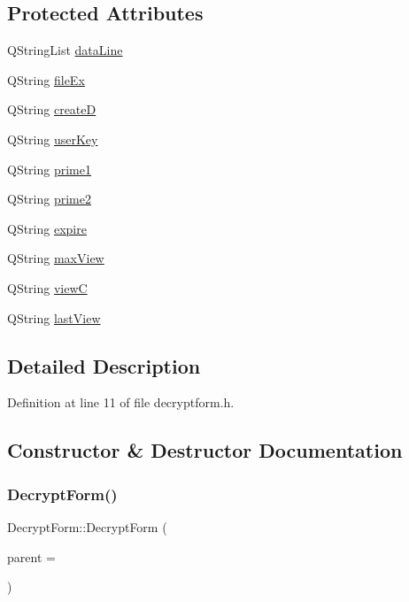 \subsection*{Protected Attributes}
\begin{DoxyCompactItemize}
\item 
Q\+String\+List \hyperlink{class_decrypt_form_a16c208fef98e40521b962932602ce0ff}{data\+Line}
\item 
Q\+String \hyperlink{class_decrypt_form_a948100789ce9a1613fc4e028609d7f7d}{file\+Ex}
\item 
Q\+String \hyperlink{class_decrypt_form_af0a16237e0a531f3167acd67eae7e69b}{createD}
\item 
Q\+String \hyperlink{class_decrypt_form_a9b9b4da9c4713812a4ef07e8e60dd25a}{user\+Key}
\item 
Q\+String \hyperlink{class_decrypt_form_a2a575d06f53701521157379069b573f0}{prime1}
\item 
Q\+String \hyperlink{class_decrypt_form_ac9b5eaa528b2826f3926e410e6ffa967}{prime2}
\item 
Q\+String \hyperlink{class_decrypt_form_ac0a3281de07c0e2b461652ce12b1ada2}{expire}
\item 
Q\+String \hyperlink{class_decrypt_form_ada58fe6ec6a6c8204e30dfdbb9e55bbe}{max\+View}
\item 
Q\+String \hyperlink{class_decrypt_form_a6363fdac4c8f9ebbdc902f1b8e3686a3}{viewC}
\item 
Q\+String \hyperlink{class_decrypt_form_a64370269794155fc85fafa42a1d31913}{last\+View}
\end{DoxyCompactItemize}


\subsection{Detailed Description}


Definition at line 11 of file decryptform.\+h.



\subsection{Constructor \& Destructor Documentation}
\hypertarget{class_decrypt_form_adedf517dfb4bb9411c4caf92943e7033}{}\label{class_decrypt_form_adedf517dfb4bb9411c4caf92943e7033} 
\subsubsection{\texorpdfstring{Decrypt\+Form()}{DecryptForm()}}
{\footnotesize\ttfamily Decrypt\+Form\+::\+Decrypt\+Form (\begin{DoxyParamCaption}\item[{\hyperlink{class_q_widget}{Q\+Widget} $\ast$}]{parent = {} }\end{DoxyParamCaption})\hspace{0.3cm}{\ttfamily [explicit]}}



